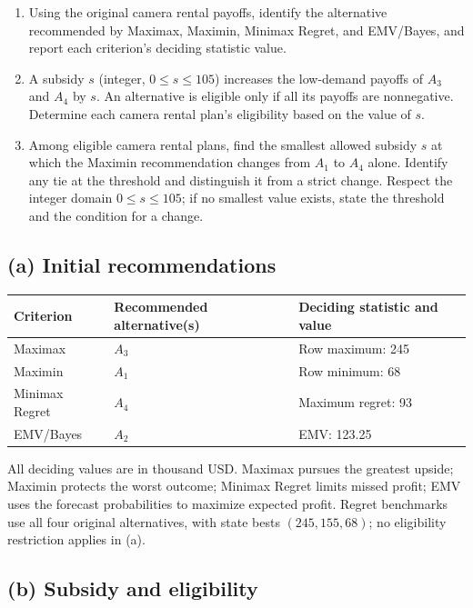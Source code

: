\begin{enumerate}[label=\textbf{(\alph*)},leftmargin=*]
	\item Using the original camera rental payoffs, identify the alternative recommended by Maximax, Maximin, Minimax Regret, and EMV/Bayes, and report each criterion's deciding statistic value. 

	\item A subsidy $s$ (integer, $0\leq s\leq105$) increases the low-demand payoffs of $A_3$ and $A_4$ by $s$. An alternative is eligible only if all its payoffs are nonnegative. Determine each camera rental plan's eligibility based on the value of $s$. 

	\item Among eligible camera rental plans, find the smallest allowed subsidy $s$ at which the Maximin recommendation changes from $A_1$ to $A_4$ alone. Identify any tie at the threshold and distinguish it from a strict change. Respect the integer domain $0\leq s\leq105$; if no smallest value exists, state the threshold and the condition for a change. 
\end{enumerate}
\label{sol:q1a}
\subsection*{(a) Initial recommendations }
\begin{center}
\begin{tabular}{lll}\toprule
Criterion & Recommended alternative(s) & Deciding statistic and value\\ \midrule
		Maximax & $A_3$ & Row maximum: 245\\
		Maximin & $A_1$ & Row minimum: 68\\
		Minimax Regret & $A_4$ & Maximum regret: 93\\
		EMV/Bayes & $A_2$ & EMV: 123.25\\
		\bottomrule\end{tabular}
\end{center}
All deciding values are in thousand USD. Maximax pursues the greatest upside; Maximin protects the worst outcome; Minimax Regret limits missed profit; EMV uses the forecast probabilities to maximize expected profit. Regret benchmarks use all four original alternatives, with state bests $(245,155,68)$; no eligibility restriction applies in (a).
\secInicio[sec:q1]


\label{sol:q1b}
\subsection*{(b) Subsidy and eligibility }

